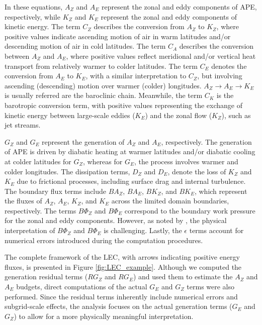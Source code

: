 \documentclass[pdflatex,sn-chicago]{sn-jnl}%
\theoremstyle{plain}
\theoremstyle{definition}
\theoremstyle{remark}
\theoremstyle{definition}
\begin{document}
In these equations, \(A_Z\) and \(A_E\) represent the zonal and eddy components of APE, respectively, while \(K_Z\) and \(K_E\) represent the zonal and eddy components of kinetic energy. The term \(C_Z\) describes the conversion from \(A_Z\) to \(K_Z\), where positive values indicate ascending motion of air in warm latitudes and/or descending motion of air in cold latitudes. The term \(C_A\) describes the conversion between \(A_Z\) and \(A_E\), where positive values reflect meridional and/or vertical heat transport from relatively warmer to colder latitudes. The term \(C_E\) denotes the conversion from \(A_E\) to \(K_E\), with a similar interpretation to \(C_Z\), but involving ascending (descending) motion over warmer (colder) longitudes. $A_Z \rightarrow A_E \rightarrow K_E$ is usually referred are the baroclinic chain. Meanwhile, the term \(C_K\) is the barotropic conversion term, with positive values representing the exchange of kinetic energy between large-scale eddies (\(K_E\)) and the zonal flow (\(K_Z\)), such as jet streams. 

\(G_Z\) and \(G_E\) represent the generation of \(A_Z\) and \(A_E\), respectively. The generation of APE is driven by diabatic heating at warmer latitudes and/or diabatic cooling at colder latitudes for \(G_Z\), whereas for \(G_E\), the process involves warmer and colder longitudes. The dissipation terms, \(D_Z\) and \(D_E\), denote the loss of \(K_Z\) and \(K_E\) due to frictional processes, including surface drag and internal turbulence. The boundary flux terms include \(BA_Z\), \(BA_E\), \(BK_Z\), and \(BK_E\), which represent the fluxes of \(A_Z\), \(A_E\), \(K_Z\), and \(K_E\) across the limited domain boundaries, respectively. The terms \(B\Phi_Z\) and \(B\Phi_E\) correspond to the boundary work pressure for the zonal and eddy components. However, as noted by \citet{muench1965dynamics}, the physical interpretation of \(B\Phi_Z\) and \(B\Phi_E\) is challenging. Lastly, the \(\epsilon\) terms account for numerical errors introduced during the computation procedures. 

The complete framework of the LEC, with arrows indicating positive energy fluxes, is presented in Figure \ref{fig:LEC_example}. Although we computed the generation residual terms ($RG_Z$ and $RG_E$) and used them to estimate the $A_Z$ and $A_E$ budgets, direct computations of the actual $G_E$ and $G_Z$ terms were also performed. Since the residual terms inherently include numerical errors and subgrid-scale effects, the analysis focuses on the actual generation terms ($G_E$ and $G_Z$) to allow for a more physically meaningful interpretation.
\end{document}
